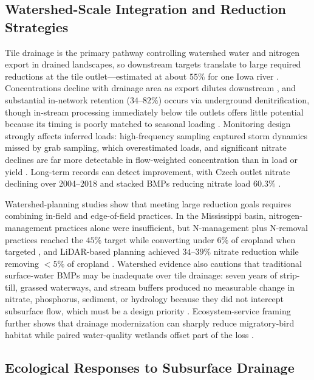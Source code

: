 \documentclass[11pt]{article}
\begin{document}
\subsection{Watershed-Scale Integration and Reduction Strategies}

Tile drainage is the primary pathway controlling watershed water and nitrogen
export in drained landscapes, so downstream targets translate to large
required reductions at the tile outlet---estimated at about $55\%$ for one
Iowa river \parencite{Schilling2012b,Ikenberry2014}. Concentrations decline
with drainage area as export dilutes downstream \parencite{Schilling2012b,Billy2013},
and substantial in-network retention ($34$--$82\%$) occurs via underground
denitrification, though in-stream processing immediately below tile outlets
offers little potential because its timing is poorly matched to seasonal
loading \parencite{Billy2011,Schilling2012b}. Monitoring design strongly
affects inferred loads: high-frequency sampling captured storm dynamics missed
by grab sampling, which overestimated loads, and significant nitrate declines
are far more detectable in flow-weighted concentration than in load or yield
\parencite{Drake2018,Danalatos2022,Irvine2019}. Long-term records can detect
improvement, with Czech outlet nitrate declining over 2004--2018 and stacked
BMPs reducing nitrate load $60.3\%$ \parencite{Fraindová2022,Law2022}.

Watershed-planning studies show that meeting large reduction goals requires
combining in-field and edge-of-field practices. In the Mississippi basin,
nitrogen-management practices alone were insufficient, but N-management plus
N-removal practices reached the $45\%$ target while converting under $6\%$ of
cropland when targeted \parencite{McLellan2015}, and LiDAR-based planning
achieved $34$--$39\%$ nitrate reduction while removing $<5\%$ of cropland
\parencite{Tomer2015,Kvítek2023}. Watershed evidence also cautions that
traditional surface-water BMPs may be inadequate over tile drainage: seven
years of strip-till, grassed waterways, and stream buffers produced no
measurable change in nitrate, phosphorus, sediment, or hydrology because they
did not intercept subsurface flow, which must be a design priority
\parencite{Lemke2011}. Ecosystem-service framing further shows that drainage
modernization can sharply reduce migratory-bird habitat while paired
water-quality wetlands offset part of the loss
\parencite{Mitchell2022,Mitchell2025,Dollinger2015}.

\subsection{Ecological Responses to Subsurface Drainage}
\end{document}
